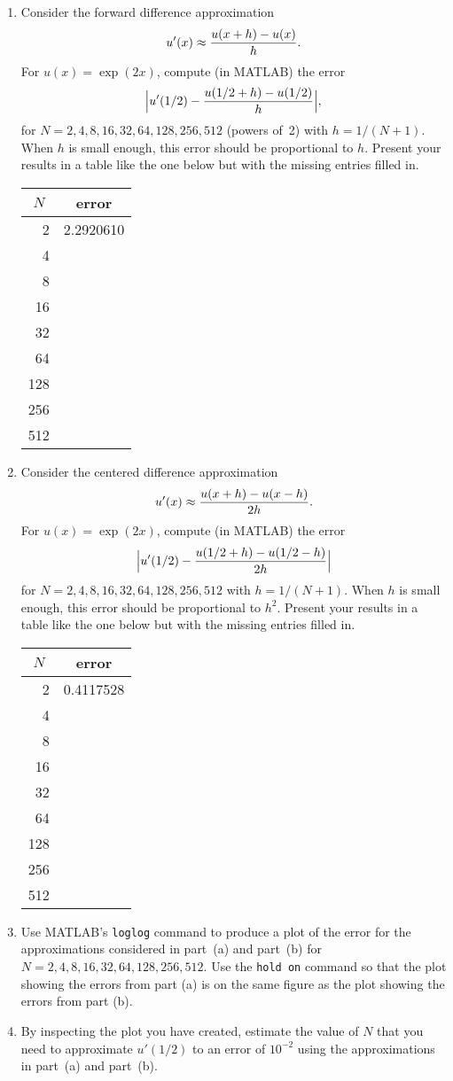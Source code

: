 
\begin{enumerate}
\item Consider the forward difference approximation
\[
u'(x) \approx {u(x+h) - u(x) \over h}.
\]
For $u(x) = \exp(2x)$, compute (in MATLAB) the error
\[
\Big| u'(1/2) -  {u(1/2+h) - u(1/2) \over h}\Big|,
\]
for $N = 2, 4, 8, 16, 32, 64, 128, 256, 512$ (powers of~2) with $h=1/(N+1)$. When $h$ is small enough, this error should be proportional to $h$. Present your results in a table like the one below but with the missing entries filled in.
\begin{center}
\begin{tabular}{r|r}
\hline
\multicolumn{1}{c|}{$N$} & \multicolumn{1}{c}{error} \\
\hline
   2 &  2.2920610 \\
   4 &   \\
   8 &   \\
  16 &   \\
  32 &   \\
  64 &   \\
 128 &   \\
 256 &   \\
 512 &  
\end{tabular}\end{center}

\item Consider the centered difference approximation
\[
u'(x) \approx {u(x+h) - u(x-h) \over 2 h}.
\]
For $u(x) = \exp(2x)$, compute (in MATLAB) the error
\[
\Big| u'(1/2) -  {u(1/2+h) - u(1/2-h) \over 2h}\Big|
\]
for $N = 2, 4, 8, 16, 32, 64, 128, 256, 512$ with $h=1/(N+1)$. When $h$ is small enough, this error should be proportional to $h^2$. Present your results in a table like the one below but with the missing entries filled in.
\begin{center}
\begin{tabular}{r|r}
\hline
\multicolumn{1}{c|}{$N$} & \multicolumn{1}{c}{error} \\
\hline
   2 &  0.4117528 \\
   4 &   \\
   8 &   \\
  16 &   \\
  32 &   \\
  64 &   \\
 128 &   \\
 256 &   \\
 512 &  
\end{tabular}\end{center}

\item Use MATLAB's \verb|loglog| command to produce a plot of the error for the approximations considered in part~(a) and part~(b) for $N = 2, 4, 8, 16, 32, 64, 128, 256, 512$. Use the \verb|hold on| command so that the plot showing the errors from part (a) is on the same figure as the plot showing the errors from part (b).
\\
\item By inspecting the plot you have created, estimate the value of $N$ that you need to approximate $u'(1/2)$ to an error of $10^{-2}$ using the approximations in part~(a) and part~(b).
\end{enumerate}




